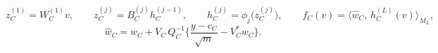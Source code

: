 \documentclass[12pt,border=2pt]{standalone}
\begin{document}
\begin{minipage}{6.2in}
\[
 z_C^{(1)}=W_C^{(1)}v,\qquad
 z_C^{(j)}=B_C^{(j)}h_C^{(j-1)},\qquad
 h_C^{(j)}=\phi_j\big(z_C^{(j)}\big),\qquad
 f_C(v)=\big\langle\widehat w_C,\,h_C^{(L)}(v)\big\rangle_{M_L},
\]
\[
 \widehat w_C=w_C+V_C\,Q_C^{-1}\Big\{\frac{y-c_C}{\sqrt m}-V_C^{*}w_C\Big\}.
\]
\end{minipage}
\end{document}
